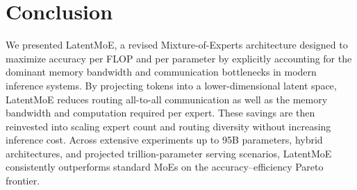 \section{Conclusion}
\label{sec:conclusion}
We presented LatentMoE, a revised Mixture-of-Experts architecture designed to maximize accuracy per FLOP and per parameter by explicitly accounting for the dominant memory bandwidth and communication bottlenecks in modern inference systems. By projecting tokens into a lower-dimensional latent space, LatentMoE reduces routing all-to-all communication as well as the memory bandwidth and computation required per expert. These savings are then reinvested into scaling expert count and routing diversity without increasing inference cost. Across extensive experiments up to 95B parameters, hybrid architectures, and projected trillion-parameter serving scenarios, LatentMoE consistently outperforms standard MoEs on the accuracy–efficiency Pareto frontier.